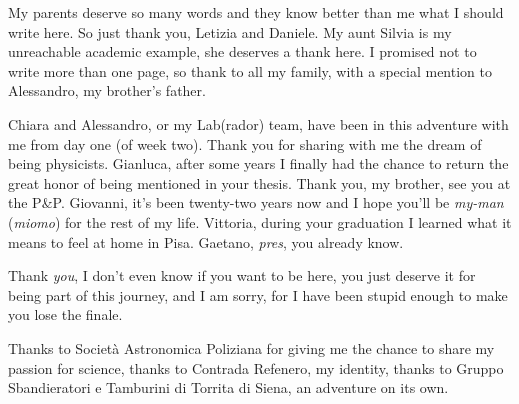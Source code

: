 My parents deserve so many words and they know better than me what I should write here.
So just thank you, Letizia and Daniele.
My aunt Silvia is my unreachable academic example, she deserves a thank here.
I promised not to write more than one page, so thank to all my family, with a special mention to Alessandro, my brother's father.

Chiara and Alessandro, or my Lab(rador) team, have been in this adventure with me from day one (of week two).
Thank you for sharing with me the dream of being physicists.
Gianluca, after some years I finally had the chance to return the great honor of being mentioned in your thesis.
Thank you, my brother, see you at the P\&P.
Giovanni, it's been twenty-two years now and I hope you'll be \emph{my-man} (\emph{miomo}) for the rest of my life.
Vittoria, during your graduation I learned what it means to feel at home in Pisa.
Gaetano, \emph{pres}, you already know.

Thank \emph{you}, I don't even know if you want to be here, you just deserve it for being part of this journey, and I am sorry, for I have been stupid enough to make you lose the finale.

Thanks to Società Astronomica Poliziana for giving me the chance to share my passion for science, thanks to Contrada Refenero, my identity, thanks to Gruppo Sbandieratori e Tamburini di Torrita di Siena, an adventure on its own.